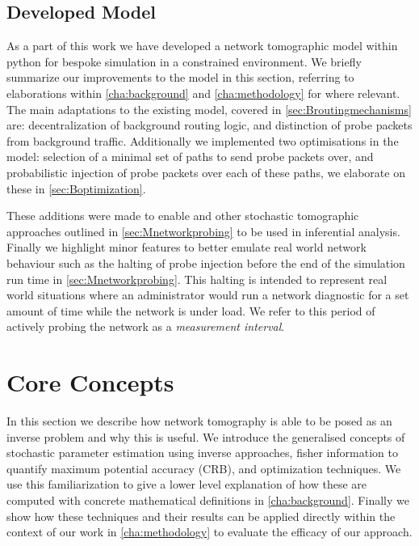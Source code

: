 \subsection{Developed Model}
\label{ssec:Idevelopedmodels}
As a part of this work we have developed a network tomographic model within python for bespoke simulation in a constrained environment. We briefly summarize our improvements to the model in this section, referring to elaborations within \cref{cha:background} and \cref{cha:methodology} for where relevant. The main adaptations to the existing model, covered in \cref{sec:Broutingmechanisms} are: decentralization of background routing logic, and distinction of probe packets from background traffic. Additionally we implemented two optimisations in the model: selection of a minimal set of paths to send probe packets over, and probabilistic injection of probe packets over each of these paths, we elaborate on these in \cref{sec:Boptimization}.\par
These additions were made to enable \pdv and other stochastic tomographic approaches outlined in \cref{sec:Mnetworkprobing} to be used in inferential analysis. Finally we highlight minor features to better emulate real world network behaviour such as the halting of probe injection before the end of the simulation run time in \cref{sec:Mnetworkprobing}. This halting is intended to represent real world situations where an administrator would run a network diagnostic for a set amount of time while the network is under load. We refer to this period of actively probing the network as a \textit{measurement interval}.

\section{Core Concepts}
\label{sec:Icoreconcepts}

In this section we describe how network tomography is able to be posed as an inverse problem and why this is useful. We introduce the generalised concepts of stochastic parameter estimation using inverse approaches, fisher information to quantify maximum potential accuracy (CRB), and optimization techniques. We use this familiarization to give a lower level explanation of how these are computed with concrete mathematical definitions in \cref{cha:background}. Finally we show how these techniques and their results can be applied directly within the context of our work in \cref{cha:methodology} to evaluate the efficacy of our approach.

